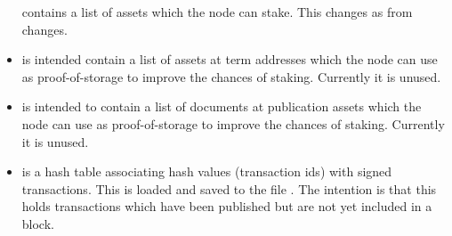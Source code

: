 \begin{itemize}
contains a list of assets which the node can stake. This changes as {} from {} changes.
\item {}
is intended contain a list of assets at term addresses which the node can use as proof-of-storage to improve the chances of staking.
Currently it is unused.
\item {}
is intended to contain a list of documents at publication assets which the node can use as proof-of-storage to improve the chances of staking.
Currently it is unused.
\item {} is a hash table associating hash values (transaction ids)
with signed transactions. This is loaded and saved to the file {}.
The intention is that this holds transactions which have been published
but are not yet included in a block.
\end{itemize}

